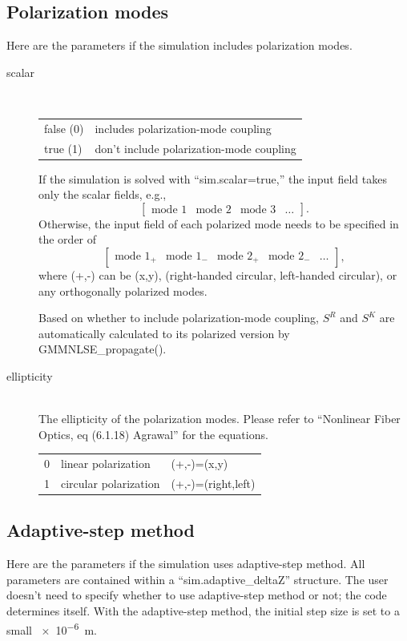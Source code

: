 \documentclass[12pt,hidelinks]{book}
\begin{document}
\subsection{Polarization modes}
Here are the parameters if the simulation includes polarization modes.

\begin{description}
\item[\color{blue}scalar]\mbox{}\\
\begin{tabular}{ll}
false (0) & includes polarization-mode coupling \\
true (1) & don't include polarization-mode coupling
\end{tabular}

If the simulation is solved with ``sim.scalar=true,'' the input field takes only the scalar fields, e.g., 
\[
\begin{bmatrix}
\text{mode 1} & \text{mode 2} & \text{mode 3} & \ldots
\end{bmatrix}.
\]
Otherwise, the input field of each polarized mode needs to be specified in the order of
\[
\begin{bmatrix}
\text{mode 1}_+ & \text{mode 1}_- & \text{mode 2}_+ & \text{mode 2}_- & \ldots
\end{bmatrix},
\]
where (+,-) can be (x,y), (right-handed circular, left-handed circular), or any orthogonally polarized modes.

Based on whether to include polarization-mode coupling, $S^R$ and $S^K$ are automatically calculated to its polarized version by GMMNLSE\_propagate().

\item[\color{blue}ellipticity]\mbox{}\\
The ellipticity of the polarization modes. Please refer to ``Nonlinear Fiber Optics, eq (6.1.18) Agrawal'' for the equations.

\begin{tabular}{lll}
0 & linear polarization & (+,-)=(x,y) \\
1 & circular polarization & (+,-)=(right,left)
\end{tabular}
\end{description}

\subsection{Adaptive-step method}
Here are the parameters if the simulation uses adaptive-step method. All parameters are contained within a ``sim.adaptive\_deltaZ'' structure. The user doesn't need to specify whether to use adaptive-step method or not; the code determines itself. With the adaptive-step method, the initial step size is set to a small \SI{e-6}{\m}.
\end{document}
